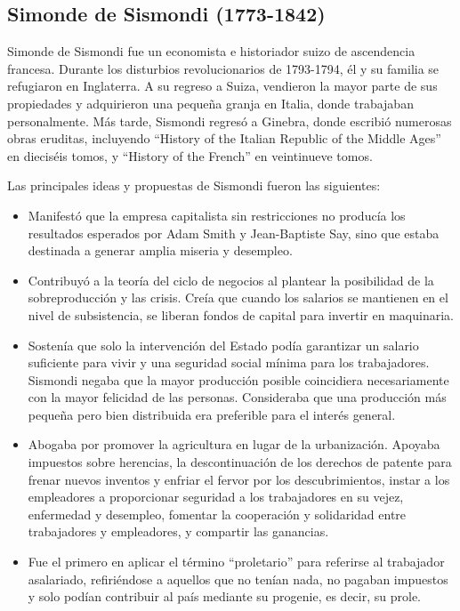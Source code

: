 \documentclass[
  jou,
  floatsintext,
  longtable,
  a4paper,
  nolmodern,
  notxfonts,
  notimes,
  12pt,
  colorlinks=true,linkcolor=blue,citecolor=blue,urlcolor=blue]{apa7}
\providecommand{\tightlist}{%
  \setlength{\itemsep}{0pt}\setlength{\parskip}{0pt}}
\begin{document}
\subsection{Simonde de Sismondi
(1773-1842)}\label{simonde-de-sismondi-1773-1842}

Simonde de Sismondi fue un economista e historiador suizo de ascendencia
francesa. Durante los disturbios revolucionarios de 1793-1794, él y su
familia se refugiaron en Inglaterra. A su regreso a Suiza, vendieron la
mayor parte de sus propiedades y adquirieron una pequeña granja en
Italia, donde trabajaban personalmente. Más tarde, Sismondi regresó a
Ginebra, donde escribió numerosas obras eruditas, incluyendo ``History
of the Italian Republic of the Middle Ages'' en dieciséis tomos, y
``History of the French'' en veintinueve tomos.

Las principales ideas y propuestas de Sismondi fueron las siguientes:

\begin{itemize}
\tightlist
\item
  Manifestó que la empresa capitalista sin restricciones no producía los
  resultados esperados por Adam Smith y Jean-Baptiste Say, sino que
  estaba destinada a generar amplia miseria y desempleo.
\item
  Contribuyó a la teoría del ciclo de negocios al plantear la
  posibilidad de la sobreproducción y las crisis. Creía que cuando los
  salarios se mantienen en el nivel de subsistencia, se liberan fondos
  de capital para invertir en maquinaria.
\item
  Sostenía que solo la intervención del Estado podía garantizar un
  salario suficiente para vivir y una seguridad social mínima para los
  trabajadores. Sismondi negaba que la mayor producción posible
  coincidiera necesariamente con la mayor felicidad de las personas.
  Consideraba que una producción más pequeña pero bien distribuida era
  preferible para el interés general.
\item
  Abogaba por promover la agricultura en lugar de la urbanización.
  Apoyaba impuestos sobre herencias, la descontinuación de los derechos
  de patente para frenar nuevos inventos y enfriar el fervor por los
  descubrimientos, instar a los empleadores a proporcionar seguridad a
  los trabajadores en su vejez, enfermedad y desempleo, fomentar la
  cooperación y solidaridad entre trabajadores y empleadores, y
  compartir las ganancias.
\item
  Fue el primero en aplicar el término ``proletario'' para referirse al
  trabajador asalariado, refiriéndose a aquellos que no tenían nada, no
  pagaban impuestos y solo podían contribuir al país mediante su
  progenie, es decir, su prole.
\end{itemize}
\end{document}

